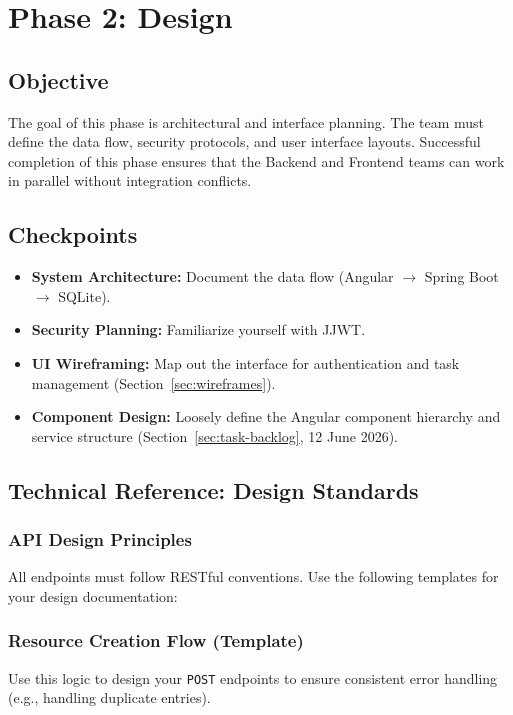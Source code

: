 \newpage
\section{Phase 2: Design}\label{sec:phase2}

\subsection{Objective}
The goal of this phase is architectural and interface planning. The team must define the data flow,
security protocols, and user interface layouts. Successful completion of this phase ensures that
the Backend and Frontend teams can work in parallel without integration conflicts.

\subsection{Checkpoints}
\begin{itemize}
  \item[$\checkmark$] \textbf{System Architecture:} Document the data flow (Angular $\rightarrow$ Spring Boot $\rightarrow$ SQLite).
  \item[$\square$] \textbf{Security Planning:} Familiarize yourself with JJWT.
  \item[$\checkmark$] \textbf{UI Wireframing:} Map out the interface for authentication and task management (Section~\ref{sec:wireframes}).
  \item[$\checkmark$] \textbf{Component Design:} Loosely define the Angular component hierarchy and service structure (Section~\ref{sec:task-backlog}, 12 June 2026).
\end{itemize}

\subsection{Technical Reference: Design Standards}

\subsubsection{API Design Principles}
All endpoints must follow RESTful conventions. Use the following templates for your design documentation:


\newpage


\subsubsection{Resource Creation Flow (Template)}
Use this logic to design your \texttt{POST} endpoints to ensure consistent error handling
(e.g., handling duplicate entries).

